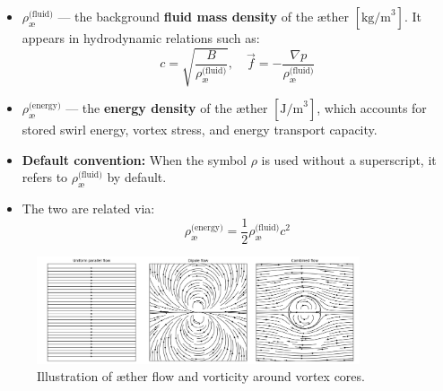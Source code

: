 \begin{itemize}
    \item \textbf{\(\rho^{\text{(fluid)}}_{\text{\ae}}\)} — the background \textbf{fluid mass density} of the æther \([ \text{kg/m}^3 ]\). It appears in hydrodynamic relations such as:
    \[
    c = \sqrt{\frac{B}{\rho^{\text{(fluid)}}_{\text{\ae}}}}, \quad \vec{f} = -\frac{\nabla p}{\rho^{\text{(fluid)}}_{\text{\ae}}}
    \]

    \item \textbf{\(\rho^{\text{(energy)}}_{\text{\ae}}\)} — the \textbf{energy density} of the æther \([ \text{J/m}^3 ]\), which accounts for stored swirl energy, vortex stress, and energy transport capacity.

    \item \textbf{Default convention:} When the symbol \(\rho\) is used without a superscript, it refers to \(\rho^{\text{(fluid)}}_{\text{\ae}}\) by default.

    \item The two are related via:
    \[
    \rho^{\text{(energy)}}_{\text{\ae}} = \frac{1}{2} \rho^{\text{(fluid)}}_{\text{\ae}} c^2
    \]
\end{itemize}

\begin{figure}[htbp]
    \centering
    \includegraphics[width=0.85\textwidth]{images/03-combined_flow}
    \caption{Illustration of æther flow and vorticity around vortex cores.}
    \label{fig:vortexfields}
\end{figure}


